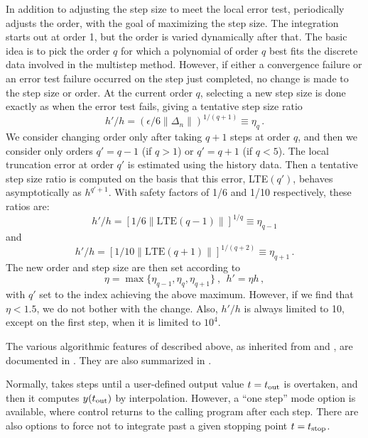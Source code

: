 In addition to adjusting the step size to meet the local error test,
{\cvodes} periodically adjusts the order, with the goal of maximizing the
step size.  The integration starts out at order 1, but the order is varied
dynamically after that.  The basic idea is to pick the order $q$ for
which a polynomial of order $q$ best fits the discrete data involved
in the multistep method.  However, if either a convergence failure or
an error test failure occurred on the step just completed, no change is made
to the step size or order.  At the current order $q$, selecting a
new step size is done exactly as when the error test fails, giving a
tentative step size ratio
\[ h'/h = (\epsilon / 6 \|\Delta_n\| )^{1/(q+1)} \equiv \eta_q \, . \]
We consider changing order only after taking $q+1$ steps at order $q$,
and then we consider only orders $q' = q - 1$ (if $q > 1$) or
$q' = q + 1$ (if $q < 5$).  The local truncation error at order $q'$
is estimated using the history data.  Then a tentative step size ratio
is computed on the basis that this error, LTE$(q')$, behaves
asymptotically as $h^{q'+1}$.  With safety factors of 1/6 and
1/10 respectively, these ratios are:
\[ h'/h = [1 / 6 \|\mbox{LTE}(q-1)\| ]^{1/q} \equiv \eta_{q-1} \]
and
\[ h'/h = [1 / 10 \|\mbox{LTE}(q+1)\| ]^{1/(q+2)} \equiv \eta_{q+1} \, . \]
The new order and step size are then set according to
\[ \eta = \max\{\eta_{q-1},\eta_q,\eta_{q+1}\} ~,~~ h' = \eta h \, , \]
with $q'$ set to the index achieving the above maximum.
However, if we find that $\eta < 1.5$, we do not bother with the
change.  Also, $h'/h$ is always limited to 10, except on the first
step, when it is limited to $10^4$.

The various algorithmic features of {\cvodes} described above, as
inherited from {\vode} and {\vodpk}, are documented in 
\cite{BBH:89,Byr:92,Hin:00}.  They are also summarized in
\cite{HBGLSSW:05}.

Normally, {\cvodes} takes steps until a user-defined output value 
$t = t_{\mbox{\scriptsize out}}$ is overtaken, and then it computes
$y(t_{\mbox{\scriptsize out}})$ by interpolation.  However, a
``one step'' mode option is available, where control returns to the
calling program after each step.  There are also options to force
{\cvodes} not to integrate past a given stopping point 
$t = t_{\mbox{\scriptsize stop}}$.



